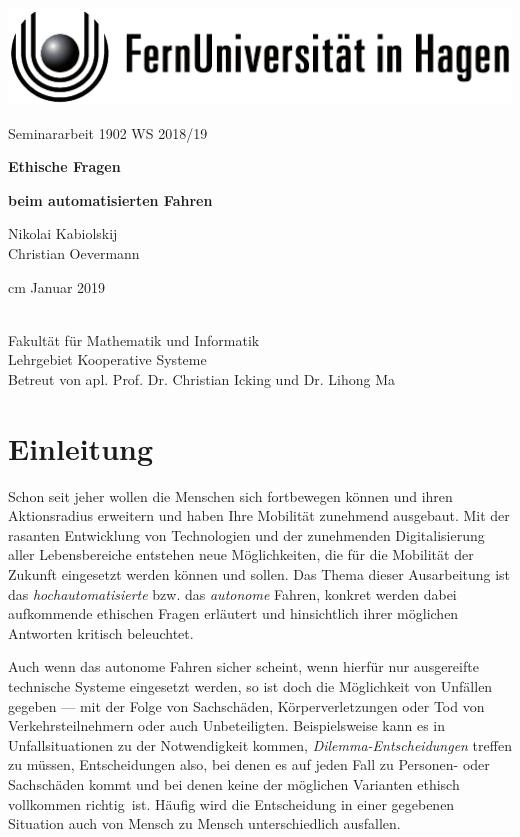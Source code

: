 \documentclass[twoside,a4paper,12pt]{article}
\begin{document}
\thispagestyle{empty}
\begin{center}
	\includegraphics[scale=1]{resources/fernunisignet-sw}
\end{center}
\vskip 4cm
\begin{center}
	{\Large Seminararbeit 1902 WS 2018/19\par}
	\vskip 2.5cm
	{\textbf{\Large Ethische Fragen} \par}    
	\vskip 0.2cm	
	{\textbf{\Large beim automatisierten Fahren} \par}    
	\vskip 1cm
	{\Large Nikolai Kabiolskij\\Christian Oevermann \par}
	 cm
	\Large Januar 2019
\end{center}
\FUiH\\
Fakultät für Mathematik und Informatik\\
Lehrgebiet Kooperative Systeme\\
Betreut von apl. Prof. Dr. Christian Icking und Dr. Lihong Ma\\
  
\newpage
\shipout\hbox{}
\newpage

\frontmatter

\section{Einleitung} \label{Einleitung}
Schon seit jeher wollen die Menschen sich fortbewegen können und ihren Aktionsradius erweitern und haben Ihre Mobilität zunehmend ausgebaut. Mit der rasanten
Entwicklung von Technologien und der zunehmenden Digitalisierung aller Lebensbereiche entstehen neue Möglichkeiten, die für die Mobilität der Zukunft eingesetzt 
werden können und sollen. Das Thema dieser Ausarbeitung ist das \textit{hochautomatisierte} bzw. das \textit{autonome} Fahren, konkret werden dabei aufkommende
ethischen Fragen erläutert und hinsichtlich ihrer möglichen Antworten kritisch beleuchtet. 

Auch wenn das autonome Fahren sicher scheint, wenn hierfür nur ausgereifte technische Systeme eingesetzt werden, so ist doch die Möglichkeit von Unfällen gegeben ---
mit der Folge von Sachschäden, Körperverletzungen oder Tod von Verkehrsteilnehmern oder auch Unbeteiligten. Beispielsweise kann es in Unfallsituationen zu der
Notwendigkeit kommen, \textit{Dilemma-Entscheidungen} treffen zu müssen, Entscheidungen also, bei denen es auf jeden Fall zu Personen- oder Sachschäden kommt
und bei denen keine der möglichen Varianten ethisch vollkommen \glqq richtig\grqq\ ist. Häufig wird die Entscheidung in einer gegebenen Situation auch von Mensch zu
Mensch unterschiedlich ausfallen. 
\end{document}
